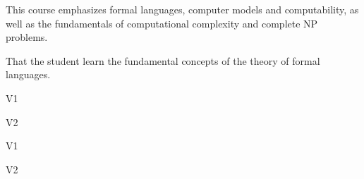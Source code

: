 \begin{syllabus}


\begin{justification}
This course emphasizes formal languages, computer models and computability, as well as the fundamentals of computational complexity and complete NP problems.
\end{justification}

\begin{goals}
\item That the student learn the fundamental concepts of the theory of formal languages.
\end{goals}

\begin{outcomes}{V1}
    \item {}
    \item {}
    \item {}
\end{outcomes}

\begin{outcomes}{V2}
    \item {}
    \item {}
    \item {}
\end{outcomes}

\begin{competences}{V1}
    \item {} 
    \item {} 
\end{competences}

\begin{competences}{V2}
    \item {} 
    \item {} 
\end{competences}


\end{syllabus}
